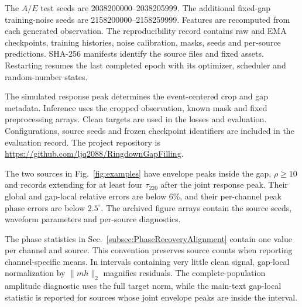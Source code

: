 \documentclass[10pt,prd,aps,a4paper,twocolumn,superscriptaddress,nofootinbib,floatfix]{revtex4-2}
\begin{document}
The $A/E$ test seeds are 2038200000--2038205999. The additional fixed-gap training-noise seeds are 2158200000--2158259999. Features are recomputed from each generated observation. The reproducibility record contains raw and EMA checkpoints, training histories, noise calibration, masks, seeds and per-source predictions. SHA-256 manifests identify the source files and fixed assets. Restarting resumes the last completed epoch with its optimizer, scheduler and random-number states.

The simulated response peak determines the event-centered crop and gap metadata. Inference uses the cropped observation, known mask and fixed preprocessing arrays. Clean targets are used in the losses and evaluation. Configurations, source seeds and frozen checkpoint identifiers are included in the evaluation record. The project repository is \url{https://github.com/ljq2088/RingdownGapFilling}.

The two sources in Fig.~\ref{fig:examples} have envelope peaks inside the gap, $\rho\ge10$ and records extending for at least four $\tau_{220}$ after the joint response peak. Their global and gap-local relative errors are below 6\%, and their per-channel peak phase errors are below $2.5^\circ$. The archived figure arrays contain the source seeds, waveform parameters and per-source diagnostics.

The phase statistics in Sec.~\ref{subsec:PhaseRecoveryAlignment} contain one value per channel and source. This convention preserves source counts when reporting channel-specific means. In intervals containing very little clean signal, gap-local normalization by $\|mh\|_2$ magnifies residuals. The complete-population amplitude diagnostic uses the full target norm, while the main-text gap-local statistic is reported for sources whose joint envelope peaks are inside the interval.
\end{document}
